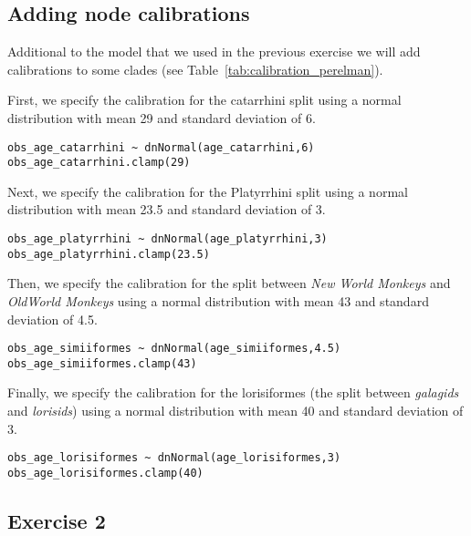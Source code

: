 \subsection{Adding node calibrations}
Additional to the model that we used in the previous exercise we will add calibrations to some clades (see Table~\ref{tab:calibration_perelman}).

First, we specify the calibration for the catarrhini split using a normal distribution with mean 29 and standard deviation of 6.
{\tt \begin{snugshade*}
\begin{lstlisting}
obs_age_catarrhini ~ dnNormal(age_catarrhini,6)
obs_age_catarrhini.clamp(29)
\end{lstlisting}
\end{snugshade*}}

Next, we specify the calibration for the Platyrrhini split using a normal distribution with mean 23.5 and standard deviation of 3.
{\tt \begin{snugshade*}
\begin{lstlisting}
obs_age_platyrrhini ~ dnNormal(age_platyrrhini,3)
obs_age_platyrrhini.clamp(23.5)
\end{lstlisting}
\end{snugshade*}}

Then, we specify the calibration for the split between \emph{New World Monkeys} and \emph{OldWorld Monkeys}  using a normal distribution with mean 43 and standard deviation of 4.5.
{\tt \begin{snugshade*}
\begin{lstlisting}
obs_age_simiiformes ~ dnNormal(age_simiiformes,4.5)
obs_age_simiiformes.clamp(43)
\end{lstlisting}
\end{snugshade*}}

Finally, we specify the calibration for the lorisiformes (the split between \emph{galagids} and \emph{lorisids}) using a normal distribution with mean 40 and standard deviation of 3.
{\tt \begin{snugshade*}
\begin{lstlisting}
obs_age_lorisiformes ~ dnNormal(age_lorisiformes,3)
obs_age_lorisiformes.clamp(40)
\end{lstlisting}
\end{snugshade*}}


\subsection{Exercise 2}

